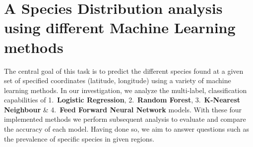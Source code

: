 \section{A Species Distribution analysis using different Machine Learning methods}

The central goal of this task is to predict the different species found at a given set of specified coordinates (latitude, longitude) using a variety of machine learning methods. In our investigation, we analyze the multi-label, classification capabilities of 1.\ \textbf{Logistic Regression}, 2.\ \textbf{Random Forest}, 3.\ \textbf{K-Nearest Neighbour} \& 4.\ \textbf{Feed Forward Neural Network} models. With these four implemented methods we perform subsequent analysis to evaluate and compare the accuracy of each model. Having done so, we aim to answer questions such as the prevalence of specific species in given regions.

